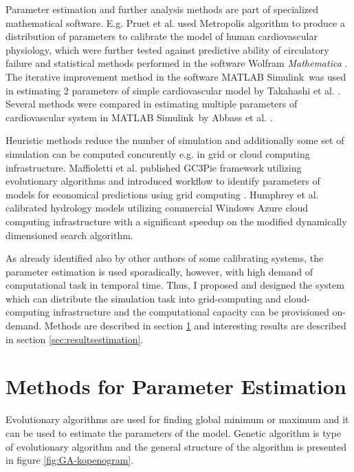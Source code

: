 Parameter estimation and further analysis methods are part of specialized mathematical software. E.g. Pruet et al. used Metropolis algorithm to produce a distribution of parameters to calibrate the model of human cardiovascular physiology, which were further tested against predictive ability of circulatory failure and statistical methods performed in the software Wolfram \textit{Mathematica} \cite{Pruett2013}. The iterative improvement method in the software MATLAB Simulink\textregistered ~was used in estimating 2 parameters of simple cardiovascular model by Takahashi et al. \cite{Takahashi2013}. Several methods were compared in estimating multiple parameters of cardiovascular system in MATLAB Simulink\textregistered ~by Abbass et al. \cite{Abbass2012}.

Heuristic methods reduce the number of simulation and additionally some set of  simulation can be computed concurently e.g. in grid or cloud computing infrastructure. 
Maffioletti et al. published GC3Pie framework utilizing evolutionary algorithms and introduced workflow to identify parameters of models for economical predictions using grid computing \cite{maffioletti2012computational}. Humphrey et al. calibrated hydrology models utilizing commercial Windows Azure cloud computing infrastructure with a significant speedup on the modified dynamically dimensioned search algorithm\cite{Humphrey2012,Tolson2007}. 


As already identified also by other authors of some calibrating systems, the parameter estimation is used sporadically, however, with high demand of computational task in temporal time. Thus, I proposed and designed the system which can distribute the simulation task into grid-computing and cloud-computing infrastructure and the computational capacity can be provisioned on-demand.%
Methods are described in section \ref{sec:methodsestimation} and interesting results are described in section \ref{sec:resultsestimation}.

\section{Methods for Parameter Estimation}
\label{sec:methodsestimation}
Evolutionary algorithms are used for finding global minimum or maximum and it can be used to estimate the parameters of the model. Genetic algorithm is type of evolutionary algorithm and the general structure of the algorithm is presented in figure \ref{fig:GA-kopenogram}.

